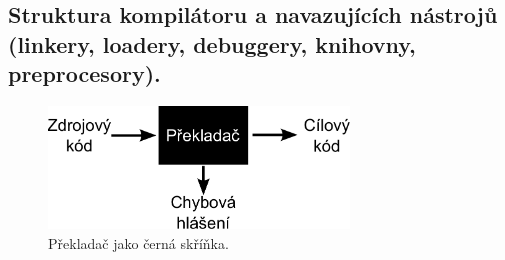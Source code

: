 \subsection{Struktura kompilátoru a navazujících nástrojů (linkery, loadery, debuggery, knihovny, preprocesory).}
\begin{figure}[h]
	\centering
	\includegraphics[width=8cm]{i2/softwarove_inzenyrstvi/obrazky/Prekladac-cerna_skrinka.pdf}
	\caption{Překladač jako černá skříňka.}
	\label{pic:Prekladac-cerna_skrinka}
\end{figure}
